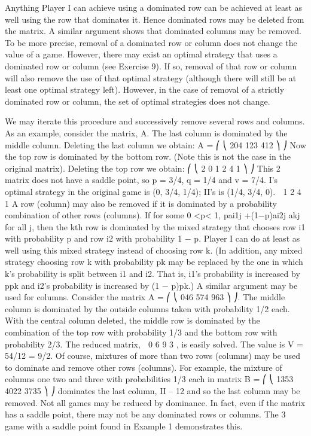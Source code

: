 \documentclass[]{report}
\begin{document}
Anything Player I can achieve using a dominated row can be achieved at least as well
using the row that dominates it. Hence dominated rows may be deleted from the matrix.
A similar argument shows that dominated columns may be removed. To be more precise,
removal of a dominated row or column does not change the value of a game. However, there
may exist an optimal strategy that uses a dominated row or column (see Exercise 9). If so,
removal of that row or column will also remove the use of that optimal strategy (although
there will still be at least one optimal strategy left). However, in the case of removal of a
strictly dominated row or column, the set of optimal strategies does not change.

We may iterate this procedure and successively remove several rows and columns. As
an example, consider the matrix, A.
The last column is dominated by the middle
column. Deleting the last column we obtain:
A =
⎛
⎝
204
123
412
⎞
⎠
Now the top row is dominated by the bottom
row. (Note this is not the case in the original
matrix). Deleting the top row we obtain:
⎛
⎝
2 0
1 2
4 1
⎞
⎠
This 2  matrix does not have a saddle point, so p = 3/4,
q = 1/4 and v = 7/4. I’s optimal strategy in the original game is
(0, 3/4, 1/4); II’s is (1/4, 3/4, 0).
 1 2
4 1
A row (column) may also be removed if it is dominated by a probability combination
of other rows (columns).
If for some 0 <p< 1, pai1j +(1−p)ai2j \geq akj for all j, then the kth row is dominated
by the mixed strategy that chooses row i1 with probability p and row i2 with probability
1 − p. Player I can do at least as well using this mixed strategy instead of choosing row
k. (In addition, any mixed strategy choosing row k with probability pk may be replaced
by the one in which k’s probability is split between i1 and i2. That is, i1’s probability is
increased by ppk and i2’s probability is increased by (1 − p)pk.) A similar argument may
be used for columns.
Consider the matrix A =
⎛
⎝
046
574
963
⎞
⎠.
The middle column is dominated by the outside columns taken with probability 1/2
each. With the central column deleted, the middle row is dominated by the combination
of the top row with probability 1/3 and the bottom row with probability 2/3. The reduced
matrix,  0 6
9 3
, is easily solved. The value is V = 54/12 = 9/2.
Of course, mixtures of more than two rows (columns) may be used to dominate and
remove other rows (columns). For example, the mixture of columns one two and three
with probabilities 1/3 each in matrix B =
⎛
⎝
1353
4022
3735
⎞
⎠ dominates the last column,
II – 12
and so the last column may be removed.
Not all games may be reduced by dominance. In fact, even if the matrix has a saddle
point, there may not be any dominated rows or columns. The 3  game with a saddle
point found in Example 1 demonstrates this.
\end{document}
